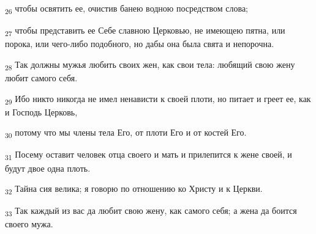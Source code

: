 \begin{tcolorbox}
\textsubscript{26} чтобы освятить ее, очистив банею водною посредством слова;
\end{tcolorbox}
\begin{tcolorbox}
\textsubscript{27} чтобы представить ее Себе славною Церковью, не имеющею пятна, или порока, или чего-либо подобного, но дабы она была свята и непорочна.
\end{tcolorbox}
\begin{tcolorbox}
\textsubscript{28} Так должны мужья любить своих жен, как свои тела: любящий свою жену любит самого себя.
\end{tcolorbox}
\begin{tcolorbox}
\textsubscript{29} Ибо никто никогда не имел ненависти к своей плоти, но питает и греет ее, как и Господь Церковь,
\end{tcolorbox}
\begin{tcolorbox}
\textsubscript{30} потому что мы члены тела Его, от плоти Его и от костей Его.
\end{tcolorbox}
\begin{tcolorbox}
\textsubscript{31} Посему оставит человек отца своего и мать и прилепится к жене своей, и будут двое одна плоть.
\end{tcolorbox}
\begin{tcolorbox}
\textsubscript{32} Тайна сия велика; я говорю по отношению ко Христу и к Церкви.
\end{tcolorbox}
\begin{tcolorbox}
\textsubscript{33} Так каждый из вас да любит свою жену, как самого себя; а жена да боится своего мужа.
\end{tcolorbox}

